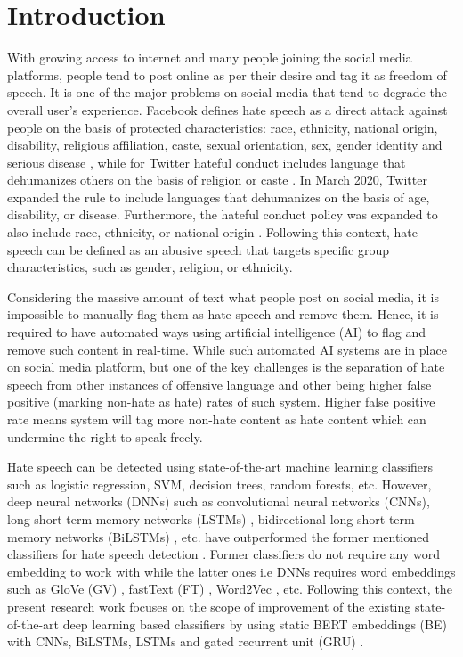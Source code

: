 \documentclass[runningheads]{llncs}
\begin{document}
\section{Introduction}
With growing access to internet and many people joining the social media platforms, people tend to post online as per their desire and tag it as freedom of speech. It is one of the major problems on social media that tend to degrade the overall user's experience. Facebook defines hate speech as a direct attack against people on the basis of protected characteristics: race, ethnicity, national origin, disability, religious affiliation, caste, sexual orientation, sex, gender identity and serious disease \cite{facebook}, while for Twitter hateful conduct includes language that dehumanizes others on the basis of religion or caste \cite{twitter}. In March 2020, Twitter expanded the rule to include languages that dehumanizes on the basis of age, disability, or disease. Furthermore, the hateful conduct policy was expanded to also include race, ethnicity, or national origin \cite{twitter}. Following this context, hate speech can be defined as an abusive speech that targets specific group characteristics, such as gender, religion, or ethnicity.

Considering the massive amount of text what people post on social media, it is impossible to manually flag them as hate speech and remove them. Hence, it is required to have automated ways using artificial intelligence (AI) to flag and remove such content in real-time. While such automated AI systems are in place on social media platform, but one of the key challenges is the separation of hate speech from other instances of offensive language and other being higher false positive (marking non-hate as hate) rates of such system. Higher false positive rate means system will tag more non-hate content as hate content which can undermine the right to speak freely.

Hate speech can be detected using state-of-the-art machine learning classifiers such as logistic regression, SVM, decision trees, random forests, etc. However, deep neural networks (DNNs) such as convolutional neural networks (CNNs), long short-term memory networks (LSTMs) \cite{lstm_hochreiter1997long}, bidirectional long short-term memory networks (BiLSTMs) \cite{bilstm}, etc. have outperformed the former mentioned classifiers for hate speech detection \cite{mollas2020ethos}. Former classifiers do not require any word embedding \cite{word_embedding} to work with while the latter ones i.e DNNs requires word embeddings such as GloVe (GV) \cite{pennington2014glove}, fastText (FT) \cite{joulin2016fasttext}, Word2Vec \cite{mikolov2013distributed}, etc. Following this context, the present research work focuses on the scope of improvement of the existing state-of-the-art deep learning based classifiers by using static BERT \cite{devlin2018bert} embeddings (BE) with CNNs, BiLSTMs, LSTMs and gated recurrent unit (GRU) \cite{gru_cho2014learning}.
\end{document}
